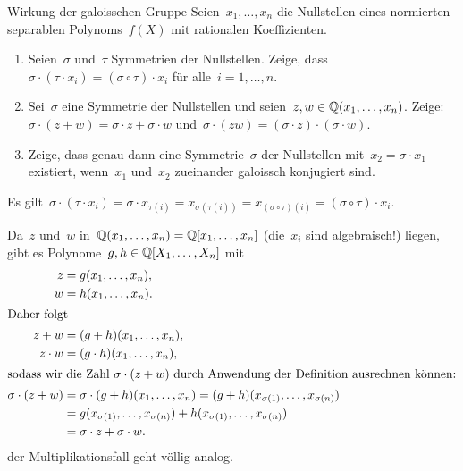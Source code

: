 \documentclass{algblatt}
\begin{document}
\vspace*{-1.5cm}

\begin{aufgabe}{Wirkung der galoisschen Gruppe}
Seien~$x_1,\ldots,x_n$ die Nullstellen eines normierten separablen
Polynoms~$f(X)$ mit rationalen Koeffizienten.
\begin{enumerate}
\item Seien~$\sigma$ und~$\tau$ Symmetrien der Nullstellen. Zeige, dass~$\sigma \cdot
(\tau \cdot x_i) = (\sigma \circ \tau) \cdot x_i$ für alle~$i = 1,\ldots,n$.

\item Sei~$\sigma$ eine Symmetrie der Nullstellen und seien~$z, w \in
\mathbb{Q}(x_1,\ldots,x_n)$. Zeige: $\sigma \cdot (z + w) = \sigma \cdot z + \sigma
\cdot w$ und~$\sigma \cdot (zw) = (\sigma \cdot z) \cdot (\sigma \cdot w)$.

\item Zeige, dass genau dann eine Symmetrie~$\sigma$ der Nullstellen
mit~$x_2 = \sigma \cdot x_1$ existiert, wenn~$x_1$ und~$x_2$ zueinander
galoissch konjugiert sind.
\end{enumerate}

\begin{loesungE}
\item Es gilt~$\sigma \cdot (\tau \cdot x_i) = \sigma \cdot x_{\tau(i)} =
x_{\sigma(\tau(i))} = x_{(\sigma \circ \tau)(i)} = (\sigma \circ \tau) \cdot
x_i$.

\item Da~$z$ und~$w$ in~$\mathbb{Q}(x_1,\ldots,x_n) = \mathbb{Q}[x_1,\ldots,x_n]$ (die~$x_i$
sind algebraisch!) liegen, gibt es Polynome~$g, h
\in \mathbb{Q}[X_1,\ldots,X_n]$ mit
\begin{align*}
  z &= g(x_1,\ldots,x_n), \\
  w &= h(x_1,\ldots,x_n). \\
\intertext{Daher folgt}
  z + w &= (g + h)(x_1,\ldots,x_n), \\
  z \cdot w &= (g \cdot h)(x_1,\ldots,x_n), \\
\intertext{sodass wir die Zahl~$\sigma \cdot (z + w)$ durch Anwendung der
Definition ausrechnen können:}
  \sigma \cdot (z+w) &= \sigma \cdot (g+h)(x_1,\ldots,x_n) =
  (g+h)(x_{\sigma(1)},\ldots,x_{\sigma(n)}) \\
  &= g(x_{\sigma(1)},\ldots,x_{\sigma(n)}) + h(x_{\sigma(1)},\ldots,x_{\sigma(n)}) \\
  &= \sigma \cdot z + \sigma \cdot w.
\end{align*}
der Multiplikationsfall geht völlig analog.


\end{loesungE}
\end{aufgabe}
\end{document}
